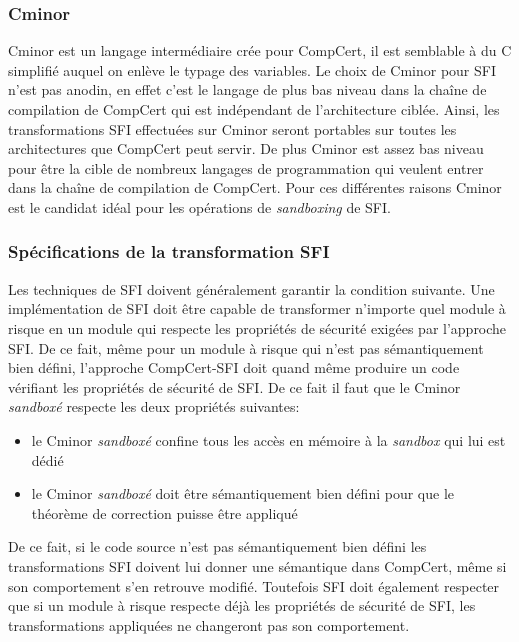 \documentclass[11pt]{sdm}
\begin{document}
\subsubsection{Cminor}
Cminor est un langage intermédiaire crée pour CompCert, il est semblable à du C simplifié auquel on enlève le typage des variables.
Le choix de Cminor pour SFI n'est pas anodin, en effet c'est le langage de plus bas niveau dans la chaîne de compilation de CompCert qui est indépendant de l'architecture ciblée. Ainsi, les transformations SFI effectuées sur Cminor seront portables sur toutes les architectures que CompCert peut servir.
De plus Cminor est assez bas niveau pour être la cible de nombreux langages de programmation qui veulent entrer dans la chaîne de compilation de CompCert.
Pour ces différentes raisons Cminor est le candidat idéal pour les opérations de \textit{sandboxing} de SFI.

\subsubsection{Spécifications de la transformation SFI}

Les techniques de SFI doivent généralement garantir la condition suivante. Une implémentation de SFI doit être capable de transformer n'importe quel module à risque en un module qui respecte les propriétés de sécurité exigées par l'approche SFI. De ce fait, même pour un module à risque qui n'est pas sémantiquement bien défini, l'approche CompCert-SFI doit quand même produire un code vérifiant les propriétés de sécurité de SFI.
 De ce fait il faut que le Cminor \textit{sandboxé} respecte les deux propriétés suivantes:
\begin{itemize}
	\item le Cminor \textit{sandboxé} confine tous les accès en mémoire à la \textit{sandbox} qui lui est dédié
	\item le Cminor \textit{sandboxé} doit être sémantiquement bien défini pour que le théorème de correction puisse être appliqué
\end{itemize}

De ce fait, si le code source n'est pas sémantiquement bien défini les transformations SFI doivent lui donner une sémantique dans CompCert, même si son comportement s'en retrouve modifié. Toutefois SFI doit également respecter que si un module à risque respecte déjà les propriétés de sécurité de SFI, les transformations appliquées ne changeront pas son comportement.
\end{document}
